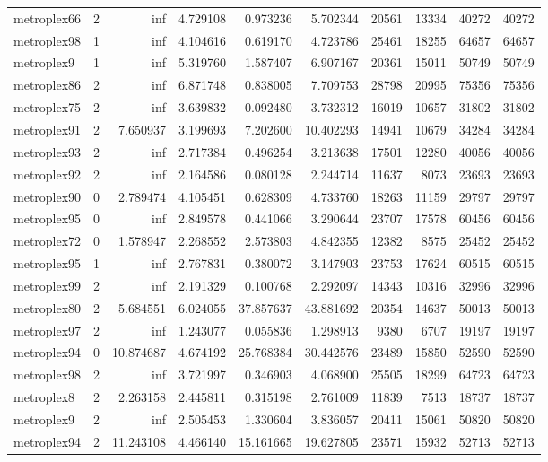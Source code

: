 \begin{longtable}{|l|r|r|r|r|r|r|r|r|r|}
metroplex66 & 2 & inf & 4.729108 & 0.973236 & 5.702344 & 20561 & 13334 & 40272 & 40272 \\
metroplex98 & 1 & inf & 4.104616 & 0.619170 & 4.723786 & 25461 & 18255 & 64657 & 64657 \\
metroplex9 & 1 & inf & 5.319760 & 1.587407 & 6.907167 & 20361 & 15011 & 50749 & 50749 \\
metroplex86 & 2 & inf & 6.871748 & 0.838005 & 7.709753 & 28798 & 20995 & 75356 & 75356 \\
metroplex75 & 2 & inf & 3.639832 & 0.092480 & 3.732312 & 16019 & 10657 & 31802 & 31802 \\
metroplex91 & 2 & 7.650937 & 3.199693 & 7.202600 & 10.402293 & 14941 & 10679 & 34284 & 34284 \\
metroplex93 & 2 & inf & 2.717384 & 0.496254 & 3.213638 & 17501 & 12280 & 40056 & 40056 \\
metroplex92 & 2 & inf & 2.164586 & 0.080128 & 2.244714 & 11637 & 8073 & 23693 & 23693 \\
metroplex90 & 0 & 2.789474 & 4.105451 & 0.628309 & 4.733760 & 18263 & 11159 & 29797 & 29797 \\
metroplex95 & 0 & inf & 2.849578 & 0.441066 & 3.290644 & 23707 & 17578 & 60456 & 60456 \\
metroplex72 & 0 & 1.578947 & 2.268552 & 2.573803 & 4.842355 & 12382 & 8575 & 25452 & 25452 \\
metroplex95 & 1 & inf & 2.767831 & 0.380072 & 3.147903 & 23753 & 17624 & 60515 & 60515 \\
metroplex99 & 2 & inf & 2.191329 & 0.100768 & 2.292097 & 14343 & 10316 & 32996 & 32996 \\
metroplex80 & 2 & 5.684551 & 6.024055 & 37.857637 & 43.881692 & 20354 & 14637 & 50013 & 50013 \\
metroplex97 & 2 & inf & 1.243077 & 0.055836 & 1.298913 & 9380 & 6707 & 19197 & 19197 \\
metroplex94 & 0 & 10.874687 & 4.674192 & 25.768384 & 30.442576 & 23489 & 15850 & 52590 & 52590 \\
metroplex98 & 2 & inf & 3.721997 & 0.346903 & 4.068900 & 25505 & 18299 & 64723 & 64723 \\
metroplex8 & 2 & 2.263158 & 2.445811 & 0.315198 & 2.761009 & 11839 & 7513 & 18737 & 18737 \\
metroplex9 & 2 & inf & 2.505453 & 1.330604 & 3.836057 & 20411 & 15061 & 50820 & 50820 \\
metroplex94 & 2 & 11.243108 & 4.466140 & 15.161665 & 19.627805 & 23571 & 15932 & 52713 & 52713 \\

\end{longtable}
